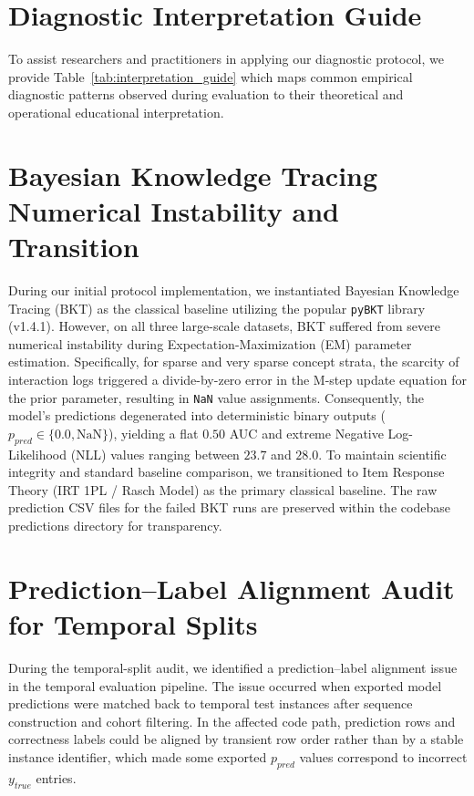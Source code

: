 

\clearpage

\section{Diagnostic Interpretation Guide}
\label{app:interpretation}
To assist researchers and practitioners in applying our diagnostic protocol, we provide Table~\ref{tab:interpretation_guide} which maps common empirical diagnostic patterns observed during evaluation to their theoretical and operational educational interpretation.



\section[Bayesian Knowledge Tracing Numerical Instability and Transition]{Bayesian Knowledge Tracing Numerical Instability and Transition}
\label{app:bkt_instability}
During our initial protocol implementation, we instantiated Bayesian Knowledge Tracing (BKT) as the classical baseline utilizing the popular \texttt{pyBKT} library (v1.4.1). However, on all three large-scale datasets, BKT suffered from severe numerical instability during Expectation-Maximization (EM) parameter estimation. Specifically, for sparse and very sparse concept strata, the scarcity of interaction logs triggered a divide-by-zero error in the M-step update equation for the prior parameter, resulting in \texttt{NaN} value assignments. Consequently, the model's predictions degenerated into deterministic binary outputs ($p_{pred} \in \{0.0, \text{NaN}\}$), yielding a flat $0.50$ AUC and extreme Negative Log-Likelihood (NLL) values ranging between $23.7$ and $28.0$. To maintain scientific integrity and standard baseline comparison, we transitioned to Item Response Theory (IRT 1PL / Rasch Model) as the primary classical baseline. The raw prediction CSV files for the failed BKT runs are preserved within the codebase predictions directory for transparency.

\section{Prediction--Label Alignment Audit for Temporal Splits}
\label{app:alignment}
During the temporal-split audit, we identified a prediction--label alignment issue in the temporal evaluation pipeline. The issue occurred when exported model predictions were matched back to temporal test instances after sequence construction and cohort filtering. In the affected code path, prediction rows and correctness labels could be aligned by transient row order rather than by a stable instance identifier, which made some exported $p_{pred}$ values correspond to incorrect $y_{true}$ entries.

